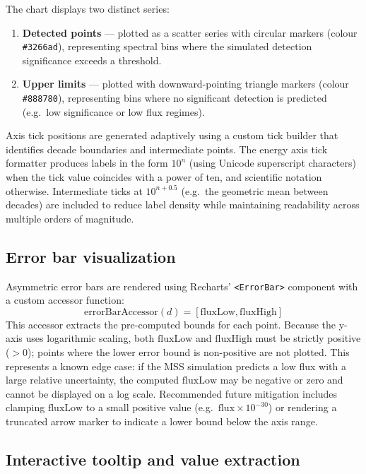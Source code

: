 \documentclass[11pt, a4paper]{article}
\begin{document}
The chart displays two distinct series:
\begin{enumerate}
    \item \textbf{Detected points} — plotted as a scatter series with circular markers (colour \texttt{\#3266ad}), representing spectral bins where the simulated detection significance exceeds a threshold.
    \item \textbf{Upper limits} — plotted with downward-pointing triangle markers (colour \texttt{\#888780}), representing bins where no significant detection is predicted (e.g.\ low significance or low flux regimes).
\end{enumerate}

Axis tick positions are generated adaptively using a custom tick builder that identifies decade boundaries and intermediate points. The energy axis tick formatter produces labels in the form $10^n$ (using Unicode superscript characters) when the tick value coincides with a power of ten, and scientific notation otherwise. Intermediate ticks at $10^{n+0.5}$ (e.g.\ the geometric mean between decades) are included to reduce label density while maintaining readability across multiple orders of magnitude.

\subsection{Error bar visualization}

Asymmetric error bars are rendered using Recharts' \texttt{<ErrorBar>} component with a custom accessor function:
\begin{equation}
    \mathrm{errorBarAccessor}(d) = [\mathrm{fluxLow}, \mathrm{fluxHigh}]
\end{equation}
This accessor extracts the pre-computed bounds for each point. Because the y-axis uses logarithmic scaling, both $\mathrm{fluxLow}$ and $\mathrm{fluxHigh}$ must be strictly positive ($> 0$); points where the lower error bound is non-positive are not plotted. This represents a known edge case: if the MSS simulation predicts a low flux with a large relative uncertainty, the computed $\mathrm{fluxLow}$ may be negative or zero and cannot be displayed on a log scale. Recommended future mitigation includes clamping $\mathrm{fluxLow}$ to a small positive value (e.g.\ $\mathrm{flux} \times 10^{-30}$) or rendering a truncated arrow marker to indicate a lower bound below the axis range.

\subsection{Interactive tooltip and value extraction}
\end{document}
